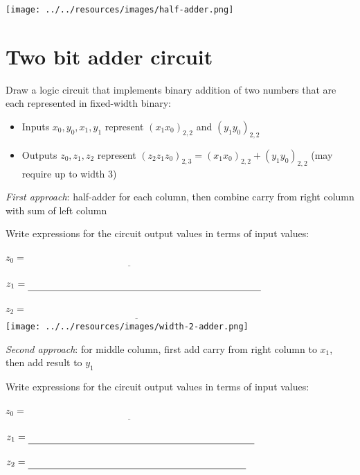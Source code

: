 \documentclass[12pt, oneside]{article}
\begin{document}
\begin{center}
\texttt{[image: ../../resources/images/half-adder.png]}
\end{center} \vfill
\section*{Two bit adder circuit}


Draw a logic circuit that implements binary addition of 
two numbers that are each represented in fixed-width binary:
\begin{itemize}
\item Inputs  $x_0, y_0, x_1, y_1$ represent $(x_1  x_0)_{2,2}$ and $(y_1 y_0)_{2,2}$
\item Outputs  $z_0, z_1, z_2$ represent $(z_2  z_1 z_0)_{2,3} = (x_1  x_0)_{2,2} + (y_1 y_0)_{2,2}$ (may require up to width  $3$)
\end{itemize}

{\it First approach}: half-adder for each column, then combine carry from right column with sum of left column


Write expressions for the circuit output values in terms of input values:

$z_0 = \underline{\phantom{x_0 \oplus y_0\hspace{3in}}}$

$z_1 = \underline{\phantom{(x_1 \oplus y_1) \oplus c_0}\hspace{2.5in}}$ \phantom{where $c_0 = x_0 \land y_0$}

$z_2 = \underline{\phantom{(c_0 \land (x_1 \oplus y_1)) \oplus c_1}\hspace{2in}}$ \phantom{where $c_1 = x_1 \land y_1$}\\

\texttt{[image: ../../resources/images/width-2-adder.png]}



{\it Second approach}: for middle column, first add carry from right column to $x_1$, then add result to $y_1$


Write expressions for the circuit output values in terms of input values:

$z_0 = \underline{\phantom{x_0 \oplus y_0}\hspace{3in}}$

$z_1 = \underline{ \phantom{(c_0 \oplus x_1) \oplus y_1}\hspace{2.4in}}$ \phantom{where $c_0 = x_0 \land y_0$}

$z_2 = \underline{\phantom{(c_0 \land x_1) \oplus ((c_0 \oplus x_1)\land y_1)}\hspace{1.5in}}$
\end{document}
